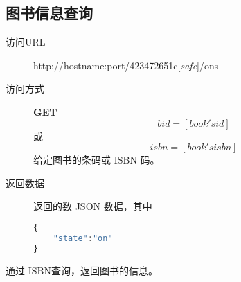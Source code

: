 \documentclass[UTF8]{article}
\def\safe{[\textit{safe}]}
\def\GET{\textbf{GET}}
\def\viaurl{\item[访问URL]}
\def\viareq#1{\item[访问方式] #1}
\def\rtdata{\item[返回数据]}
\begin{document}
        \subsection{图书信息查询}
        \begin{description}
	        \viaurl http://hostname:port/423472651c\safe/ons
	        \viareq{\GET}
	        $$bid=[book's id]$$
	        或
	        $$isbn=[book's isbn]$$
	        给定图书的条码或 ISBN 码。
	        \rtdata 返回的数 JSON 数据，其中
	        \begin{lstlisting}[language=JavaScript]
{
	"state":"on"
}
	        \end{lstlisting}
	         \end{description}
                通过 ISBN查询，返回图书的信息。
\end{document}
